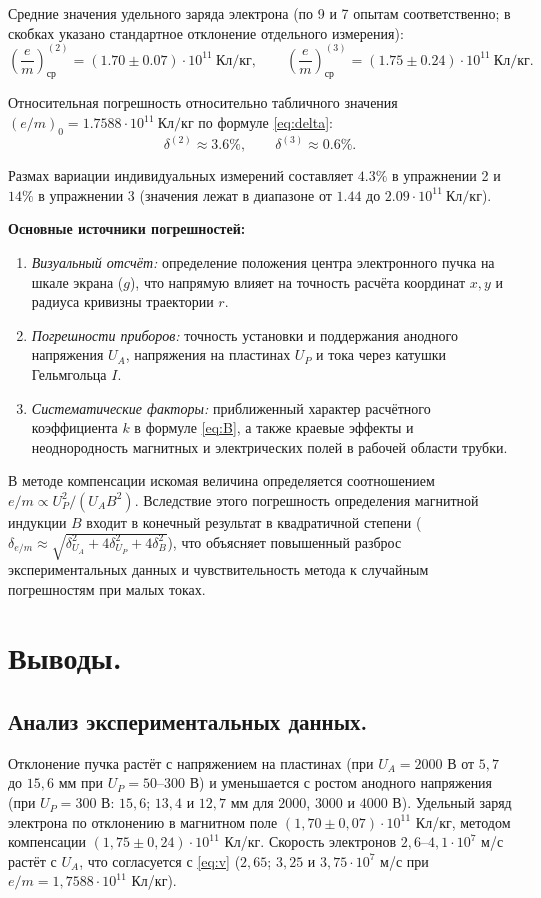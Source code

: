 \documentclass[12pt, a4paper]{article}
\begin{document}
	Средние значения удельного заряда электрона (по 9 и 7 опытам соответственно; в скобках указано стандартное отклонение отдельного измерения):
	\[
	\left(\frac{e}{m}\right)_{\text{ср}}^{(2)} = (1.70 \pm 0.07)\cdot 10^{11}\ \text{Кл/кг}, \qquad \left(\frac{e}{m}\right)_{\text{ср}}^{(3)} = (1.75 \pm 0.24)\cdot 10^{11}\ \text{Кл/кг}.
	\]
	
	Относительная погрешность относительно табличного значения $(e/m)_0 = 1.7588 \cdot 10^{11}\ \text{Кл/кг}$ по формуле \eqref{eq:delta}:
	\[
	\delta^{(2)} \approx 3.6\%, \qquad \delta^{(3)} \approx 0.6\%.
	\]
	
	Размах вариации индивидуальных измерений составляет $4.3\%$ в упражнении 2 и $14\%$ в упражнении 3 (значения лежат в диапазоне от $1.44$ до $2.09 \cdot 10^{11}\ \text{Кл/кг}$).
	
	\textbf{Основные источники погрешностей:}
	\begin{enumerate}
		\item \textit{Визуальный отсчёт:} определение положения центра электронного пучка на шкале экрана ($g$), что напрямую влияет на точность расчёта координат $x, y$ и радиуса кривизны траектории $r$.
		\item \textit{Погрешности приборов:} точность установки и поддержания анодного напряжения $U_A$, напряжения на пластинах $U_P$ и тока через катушки Гельмгольца $I$.
		\item \textit{Систематические факторы:} приближенный характер расчётного коэффициента $k$ в формуле \eqref{eq:B}, а также краевые эффекты и неоднородность магнитных и электрических полей в рабочей области трубки.
	\end{enumerate}
	
	
	\newpage
	В методе компенсации искомая величина определяется соотношением $e/m \propto U_P^2 / (U_A B^2)$. Вследствие этого погрешность определения магнитной индукции $B$ входит в конечный результат в квадратичной степени ($\delta_{e/m} \approx \sqrt{\delta_{U_A}^2 + 4\delta_{U_P}^2 + 4\delta_B^2}$), что объясняет повышенный разброс экспериментальных данных и чувствительность метода к случайным погрешностям при малых токах.
	
	\section{Выводы.}
	\subsection*{Анализ экспериментальных данных.}
	Отклонение пучка растёт с напряжением на пластинах (при $U_A = 2000$ В от $5{,}7$ до $15{,}6$ мм при $U_P = 50$--$300$ В) и уменьшается с ростом анодного напряжения (при $U_P = 300$ В: $15{,}6$; $13{,}4$ и $12{,}7$ мм для $2000$, $3000$ и $4000$ В). Удельный заряд электрона по отклонению в магнитном поле $(1{,}70 \pm 0{,}07)\cdot 10^{11}$ Кл/кг, методом компенсации $(1{,}75 \pm 0{,}24)\cdot 10^{11}$ Кл/кг. Скорость электронов $2{,}6$--$4{,}1 \cdot 10^{7}$ м/с растёт с $U_A$, что согласуется с \eqref{eq:v} ($2{,}65$; $3{,}25$ и $3{,}75 \cdot 10^{7}$ м/с при $e/m = 1{,}7588\cdot 10^{11}$ Кл/кг).
	
\end{document}
